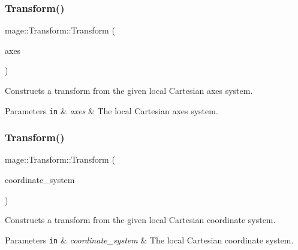 \subsubsection{\texorpdfstring{Transform()}{Transform()}\hspace{0.1cm}{\footnotesize\ttfamily [1/4]}}
{\footnotesize\ttfamily mage\+::\+Transform\+::\+Transform (\begin{DoxyParamCaption}\item[{const \hyperlink{structmage_1_1_cartesian_axes_system}{Cartesian\+Axes\+System} \&}]{axes }\end{DoxyParamCaption})}

Constructs a transform from the given local Cartesian axes system.


\begin{DoxyParams}[1]{Parameters}
\mbox{\tt in}  & {\em axes} & The local Cartesian axes system. \\
\hline
\end{DoxyParams}
\hypertarget{structmage_1_1_transform_a15966913f9d2f02f29da116637fc3bff}{}\label{structmage_1_1_transform_a15966913f9d2f02f29da116637fc3bff} 
\subsubsection{\texorpdfstring{Transform()}{Transform()}\hspace{0.1cm}{\footnotesize\ttfamily [2/4]}}
{\footnotesize\ttfamily mage\+::\+Transform\+::\+Transform (\begin{DoxyParamCaption}\item[{const \hyperlink{structmage_1_1_cartesian_coordinate_system}{Cartesian\+Coordinate\+System} \&}]{coordinate\+\_\+system }\end{DoxyParamCaption})}

Constructs a transform from the given local Cartesian coordinate system.


\begin{DoxyParams}[1]{Parameters}
\mbox{\tt in}  & {\em coordinate\+\_\+system} & The local Cartesian coordinate system. \\
\hline
\end{DoxyParams}
\hypertarget{structmage_1_1_transform_a3d324dc935e11ee5e82957d58553fd7d}{}\label{structmage_1_1_transform_a3d324dc935e11ee5e82957d58553fd7d} 
